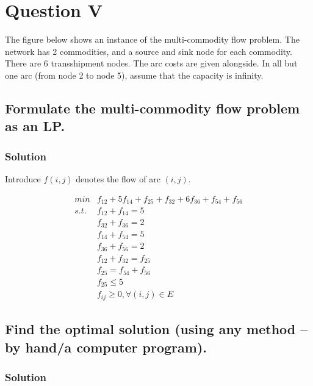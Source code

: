 \documentclass[11pt]{article}
\begin{document}
    \hypertarget{question-v}{%
\section{Question V}\label{question-v}}

    The figure below shows an instance of the multi-commodity flow problem.
The network has 2 commodities, and a source and sink node for each
commodity. There are 6 transshipment nodes. The arc costs are given
alongside. In all but one arc (from node 2 to node 5), assume that the
capacity is infinity.

\hypertarget{formulate-the-multi-commodity-flow-problem-as-an-lp.}{%
\subsection{Formulate the multi-commodity flow problem as an
LP.}\label{formulate-the-multi-commodity-flow-problem-as-an-lp.}}

\hypertarget{solution}{%
\subsubsection{Solution}\label{solution}}

Introduce \(f(i,j)\) denotes the flow of arc \((i,j)\).

\[\begin{align*}
min &f_{12}+ 5f_{14} +f_{25} +f_{32}+6f_{36}+f_{54}+f_{56} \\
s.t. &f_{12}+ f_{14} =5 \\
&f_{32}+f_{36}=2 \\
&f_{14} +f_{54}=5 \\
&f_{36} +f_{56}=2 \\
&f_{12} +f_{32}=f_{25} \\
&f_{25} =f_{54}+f_{56}\\
&f_{25} \leq 5 \\
&f_{ij} \geq 0, \forall (i,j) \in E
\end{align*}\]

\hypertarget{find-the-optimal-solution-using-any-method-by-handa-computer-program.}{%
\subsection{Find the optimal solution (using any method -- by hand/a
computer
program).}\label{find-the-optimal-solution-using-any-method-by-handa-computer-program.}}

\hypertarget{solution-1}{%
\subsubsection{Solution}\label{solution-1}}
\end{document}
